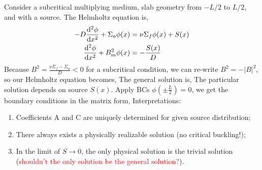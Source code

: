 \documentclass{school-22.211-notes}
\begin{document}
\clearpage
{}
Consider a subcritical multiplying medium, slab geometry from $-L/2$ to $L/2$, and with a source. The Helmholtz equation is,
\begin{align}
  - D \frac{\mathrm{d}^{2}\phi}{\mathrm{d}x^{2}} + \Sigma_a \phi(x) &= \nu \Sigma_f \phi(x) + S(x) \\
  \frac{\mathrm{d}^{2}\phi}{\mathrm{d}x^{2}} + B_m^2 \phi(x) &= -\frac{S(x)}{D} 
\end{align}
Because $B^2 = \frac{\nu \Sigma_f - \Sigma_a}{D} < 0 $ for a subcritical condition, we can re-write $B^2 = - |B|^2$, so our Helmholtz equation becomes,
The general solution is,
The particular solution depends on source $S(x)$. Apply BCs $\phi \left( \pm \frac{L}{2} \right) = 0$, we get the boundary conditions in the matrix form,
Interpretations:
\begin{enumerate}
\item Coefficients A and C are uniquely determined for given source distribution; 
\item There always exists a physically realizable solution (no critical buckling!);
\item In the limit of $S\to 0$, the only physical solution is the trivial solution (\textcolor{red}{shouldn't the only solution be the general solution?}). 
\end{enumerate}
\end{document}
